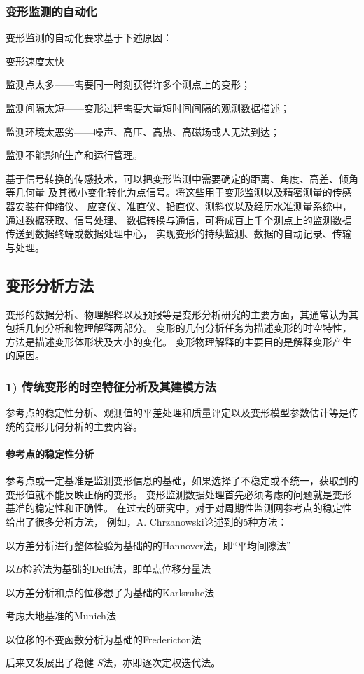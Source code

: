 \subsubsection*{变形监测的自动化}
变形监测的自动化要求基于下述原因：
\begin{asparaitem}[$\bullet$]
\item 变形速度太快
\item 监测点太多——需要同一时刻获得许多个测点上的变形；
\item 监测间隔太短——变形过程需要大量短时间间隔的观测数据描述；
\item 监测环境太恶劣——噪声、高压、高热、高磁场或人无法到达；
\item 监测不能影响生产和运行管理。
\end{asparaitem}
基于信号转换的传感技术，可以把变形监测中需要确定的距离、角度、高差、倾角等几何量
及其微小变化转化为点信号。将这些用于变形监测以及精密测量的传感器安装在伸缩仪、
应变仪、准直仪、铅直仪、测斜仪以及经历水准测量系统中，通过数据获取、信号处理、
数据转换与通信，可将成百上千个测点上的监测数据传送到数据终端或数据处理中心，
实现变形的持续监测、数据的自动记录、传输与处理。

\subsection{变形分析方法}
变形的数据分析、物理解释以及预报等是变形分析研究的主要方面，其通常认为其包括几何分析和物理解释两部分。
变形的几何分析任务为描述变形的时空特性，方法是描述变形体形状及大小的变化。
变形物理解释的主要目的是解释变形产生的原因。

\subsubsection*{1) 传统变形的时空特征分析及其建模方法}
参考点的稳定性分析、观测值的平差处理和质量评定以及变形模型参数估计等是传统的变形几何分析的主要内容。
\paragraph*{参考点的稳定性分析} 
参考点或一定基准是监测变形信息的基础，如果选择了不稳定或不统一，获取到的变形值就不能反映正确的变形。
变形监测数据处理首先必须考虑的问题就是变形基准的稳定性和正确性。
在过去的研究中，对于对周期性监测网参考点的稳定性给出了很多分析方法，
例如，A. Chrzanowski论述到的5种方法：
\begin{asparaitem}[$\bullet$]
\item 以方差分析进行整体检验为基础的的Hannover法，即“平均间隙法”
\item 以$B$检验法为基础的Delft法，即单点位移分量法
\item 以方差分析和点的位移想了为基础的Karlsruhe法
\item 考虑大地基准的Munich法
\item 以位移的不变函数分析为基础的Fredericton法
\end{asparaitem}
后来又发展出了稳健-$S$法，亦即逐次定权迭代法。
